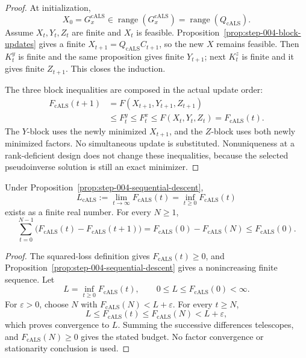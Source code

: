 \begin{proof}
At initialization,
\[
 X_0=G_x^{\mathrm{cALS}}
 \in\operatorname{range}(G_x^{\mathrm{cALS}})
 =\operatorname{range}(Q_{\mathrm{cALS}}).
\]
Assume $X_t,Y_t,Z_t$ are finite and $X_t$ is feasible.
Proposition~\ref{prop:step-004-block-updates} gives a finite
$X_{t+1}=Q_{\mathrm{cALS}}C_{t+1}$, so the new $X$ remains feasible.  Then
$K_t^y$ is finite and the same proposition gives finite $Y_{t+1}$; next
$K_t^z$ is finite and it gives finite $Z_{t+1}$.  This closes the induction.

The three block inequalities are composed in the actual update order:
\[
 \begin{aligned}
 F_{\mathrm{cALS}}(t+1)
 &=F(X_{t+1},Y_{t+1},Z_{t+1})\\
 &\le F_t^y\le F_t^x
 \le F(X_t,Y_t,Z_t)=F_{\mathrm{cALS}}(t).
 \end{aligned}
\]
The $Y$-block uses the newly minimized $X_{t+1}$, and the $Z$-block uses
both newly minimized factors.  No simultaneous update is substituted.
Nonuniqueness at a rank-deficient design does not change these inequalities,
because the selected pseudoinverse solution is still an exact minimizer.
\end{proof}

\begin{lemma}\label{lem:step-004-scalar-limit}
Under Proposition~\ref{prop:step-004-sequential-descent},
\[
 L_{\mathrm{cALS}}
 :=\lim_{t\to\infty}F_{\mathrm{cALS}}(t)
 =\inf_{t\ge0}F_{\mathrm{cALS}}(t)
\]
exists as a finite real number.  For every $N\ge1$,
\[
 \sum_{t=0}^{N-1}
 \bigl(F_{\mathrm{cALS}}(t)-F_{\mathrm{cALS}}(t+1)\bigr)
 =F_{\mathrm{cALS}}(0)-F_{\mathrm{cALS}}(N)
 \le F_{\mathrm{cALS}}(0).
\]
\end{lemma}

\begin{proof}
The squared-loss definition gives $F_{\mathrm{cALS}}(t)\ge0$, and
Proposition~\ref{prop:step-004-sequential-descent} gives a nonincreasing
finite sequence.  Let
\[
 L=\inf_{t\ge0}F_{\mathrm{cALS}}(t),
 \qquad 0\le L\le F_{\mathrm{cALS}}(0)<\infty.
\]
For $\varepsilon>0$, choose $N$ with
$F_{\mathrm{cALS}}(N)<L+\varepsilon$.  For every $t\ge N$,
\[
 L\le F_{\mathrm{cALS}}(t)
 \le F_{\mathrm{cALS}}(N)<L+\varepsilon,
\]
which proves convergence to $L$.  Summing the successive differences
telescopes, and $F_{\mathrm{cALS}}(N)\ge0$ gives the stated budget.
No factor convergence or stationarity conclusion is used.
\end{proof}

